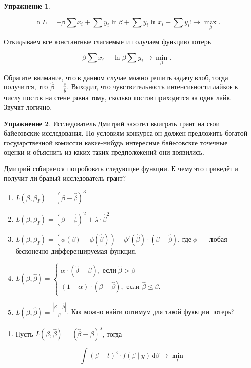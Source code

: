 \documentclass[12pt, a4paper, oneside]{extreport}
\def \hb{\hat{\beta}}
\def \b{\beta}
\newcommand{\dx}[1]{\,\mathrm{d}#1} %
\theoremstyle{plain}              %
\theoremstyle{definition}         %
\newtheorem{problem}{\color{myblue} Упражнение}
\begin{document}
\begin{problem}
\begin{sol}
\begin{enumerate}
		\[\ln L = -\beta \sum x_i + \sum y_i \ln \beta + \sum y_i \ln x_i - \sum y_i! \to \max_{\beta}.\]
		
		Откидываем все константные слагаемые и получаем функцию потерь
		
		\[\beta \sum x_i -  \ln \beta \sum y_i   \to \min_{\beta}. \]
		
		Обратите внимание, что в данном случае можно решить задачу влоб, тогда получится, что $\hat \beta = \frac{\bar x}{\bar y}.$ Выходит, что чувствительность интенсивности лайков к числу постов на стене равна тому, сколько постов приходится на один лайк. Звучит логично. 		
	\end{enumerate}		
	\end{sol}
\end{problem}


\begin{problem}
Исследователь Дмитрий захотел выиграть грант на свои байесовские исследования. По условиям конкурса он должен предложить богатой государственной комиссии какие-нибудь интересные байесовские точечные оценки и объяснить из каких-таких предположений они появились. 

Дмитрий собирается попробовать следующие функции. К чему это приведёт и получит ли бравый исследователь грант?  
\begin{enumerate}
\item $L(\beta, \beta_F) = (\beta - \hat \beta)^3$
\item $L(\beta, \beta_F) = (\beta - \hat \beta)^2 + \lambda \cdot  \hat \b^2 $
\item $L(\beta, \beta_F) = (\phi(\beta) - \phi(\hb)) - \phi'(\hb) \cdot(\b - \hb) $, где $\phi$ --- любая бесконечно дифференцируемая функция. 
\item $L(\b, \hb) = \begin{cases} \alpha \cdot (\hb - \b), \text{ если } \hb > \b \\ (1 - \alpha) \cdot (\b - \hb), \text{ если } \hb \le \b . \end{cases}$
\item $L(\b , \hb) = \frac{|\b - \hb|}{\b} $. Как можно найти оптимум для такой функции потерь? 
\end{enumerate}
\begin{sol}

\begin{enumerate}
\item 

Пусть $L(\beta, \hb) = (\hb  - \beta)^3$, тогда 

\[ \int (\beta - t)^3 \cdot f(\beta \mid y) \dx{\beta} \to \min_{t} \] 


\end{enumerate}
\end{sol}
\end{problem}
\end{document}
